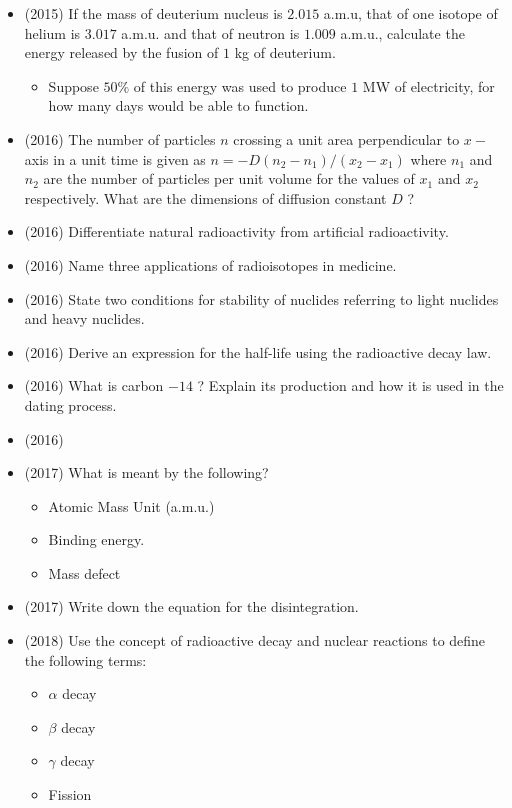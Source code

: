 \documentclass{article}
\begin{document}
\begin{itemize}
\begin{itemize}
\end{itemize}
\item (2015)  If the mass of deuterium nucleus is $ 2.015$ a.m.u, that of one isotope of helium is $ 3.017$ a.m.u. and that of neutron is $ 1.009$ a.m.u., calculate the energy released by the fusion of $ 1$ kg of deuterium. \begin{itemize}
\item Suppose $ 50\%$ of this energy was used to produce $ 1$ MW of electricity, for how many days would be able to function.
\end{itemize}
\item (2016)  The number of particles $ n$ crossing a unit area perpendicular to $ x-$ axis in a unit time is given as $ n=-D(n_{2}-n_{1})/(x_{2}-x_{1})$ where $ n_{1}$ and $ n_{2}$ are the number of particles per unit volume for the values of $ x_{1}$ and $ x_{2}$ respectively.  What are the dimensions of diffusion constant $ D$ ?
\item (2016)  Differentiate natural radioactivity from artificial radioactivity.
\item (2016)  Name three applications of radioisotopes in medicine.
\item (2016)  State two conditions for stability of nuclides referring to light nuclides and heavy nuclides.
\item (2016)  Derive an expression for the half-life using the radioactive decay law.
\item (2016)  What is carbon $ -14$ ?  Explain its production and how it is used in the dating process.
\item (2016)  \item (2017)  What is meant by the following?\begin{itemize}
\item Atomic Mass Unit (a.m.u.)
\item Binding energy. 
\item Mass defect
\end{itemize}
\item (2017)  Write down the equation for the disintegration.
\item (2018)  Use the concept of radioactive decay and nuclear reactions to define the following terms:\begin{itemize}
\item $ \alpha $ decay
\item $ \beta$ decay
\item $ \gamma $ decay
\item Fission

\end{itemize}
\end{itemize}
\end{document}
